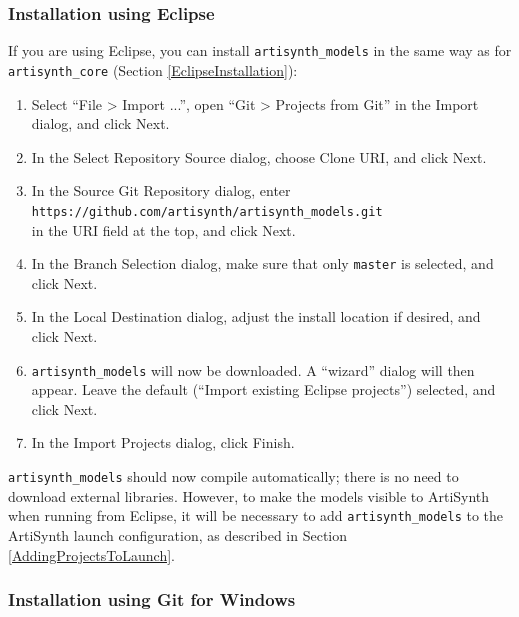 \subsubsection{Installation using Eclipse}

If you are using Eclipse, you can install {\tt artisynth\_models} in
the same way as for {\tt artisynth\_core} (Section
\ref{EclipseInstallation}):

\begin{enumerate}

\item Select {\sf ``File > Import ...''}, open
{\sf ``Git > Projects from Git''} in the Import dialog,
and click {\sf Next}.

\item In the {\sf Select Repository Source}
dialog, choose {\sf Clone URI}, and click {\sf Next}.

\item In the {\sf Source Git Repository} dialog,
enter\\
{\tt https://github.com/artisynth/artisynth\_models.git}\\
in the {\sf URI} field at the top, and click {\sf Next}.

\item In the {\sf Branch Selection} dialog, make sure that only
{\tt master} is selected, and click {\sf Next}.

\item In the {\sf Local Destination} dialog,
adjust the install location if desired, and click {\sf Next}.

\item {\tt artisynth\_models} will now be downloaded.
A ``wizard'' dialog will
then appear. Leave the default ({\sf ``Import existing Eclipse
projects''}) selected, and click {\sf Next}.

\item In the {\sf Import Projects} dialog, click {\sf Finish}.

\end{enumerate}

{\tt artisynth\_models} should now compile automatically; there is no
need to download external libraries. However, to 
make the models visible to ArtiSynth when running from Eclipse, it
will be necessary to add {\tt artisynth\_models} to the ArtiSynth
launch configuration, as described in Section
\ref{AddingProjectsToLaunch}.

\ifWindows
\subsubsection{Installation using Git for Windows}

